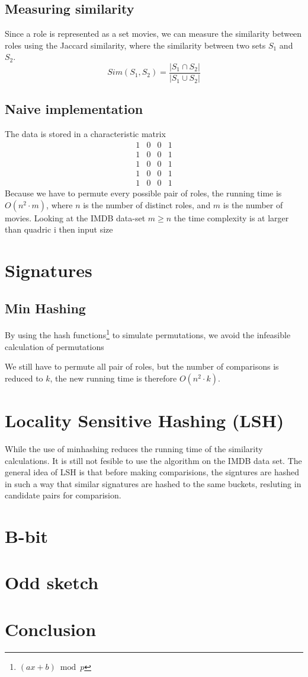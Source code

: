 \documentclass[a4paper,11pt]{article}
\begin{document}
\subsection{Measuring similarity}
Since a role is represented as a set movies, we can measure the similarity between roles using the Jaccard similarity, where the similarity between two sets $S_1$ and $S_2$.
\begin{equation}
Sim(S_1, S_2) = \frac{|S_1 \cap S_2|}{|S_1 \cup S_2|}
\end{equation}

\subsection{Naive implementation}

The data is stored in a characteristic matrix
\begin{equation}
\begin{matrix}
    1 & 0 & 0 & 1\\
    1 & 0 & 0 & 1\\
    1 & 0 & 0 & 1\\
    1 & 0 & 0 & 1\\
    1 & 0 & 0 & 1
\end{matrix}
\end{equation}
Because we have to permute every possible pair of roles, 
the running time is $O(n^2 \cdot m)$, where $n$ is the number of distinct roles, and $m$ is the number of movies. Looking at the IMDB data-set $m \geq n$ the time complexity is at larger than quadric i then input size


\section{Signatures}

\subsection{Min Hashing}

By using the hash functions\footnote{$(ax + b) \bmod p$} to simulate permutations, we avoid the infeasible calculation of permutations

We still have to permute all pair of roles, but the number of comparisons is reduced to $k$, the new running time is therefore $O(n^2 \cdot k)$.

\section{Locality Sensitive Hashing (LSH)}
While the use of minhashing reduces the running time of the similarity calculations. It is still not fesible to use the algorithm on the IMDB data set. The general idea of LSH is that before making comparisions, the signtures are hashed in such a way that similar signatures are hashed to the same buckets, resluting in candidate pairs for comparision.

\section{B-bit}

\section{Odd sketch}

\section{Conclusion}
\end{document}
